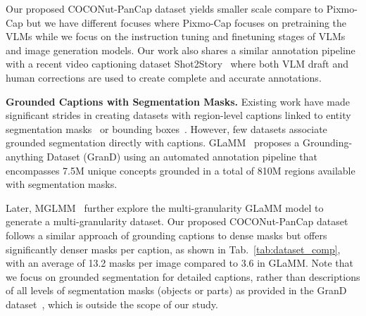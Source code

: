 Our proposed COCONut-PanCap dataset yields smaller scale compare to Pixmo-Cap but we have different focuses where Pixmo-Cap focuses on pretraining the VLMs while we focus on the instruction tuning and finetuning stages of VLMs and image generation models. Our work also shares a similar annotation pipeline with a recent video captioning dataset Shot2Story~\cite{han2023shot2story20k} where both VLM draft and human corrections are used to create complete and accurate annotations.



\noindent\textbf{Grounded Captions with Segmentation Masks.}
Existing work have made significant strides in creating datasets with region-level captions linked to entity segmentation masks~\cite{yuan2024osprey} or bounding boxes~\cite{zhang2023gpt4roi}. However, few datasets associate grounded segmentation directly with captions. GLaMM~\cite{hanoona2023GLaMM} proposes a Grounding-anything Dataset (GranD) using an automated annotation pipeline that encompasses 7.5M unique concepts grounded in a total of 810M regions available with segmentation masks. 
 
Later, MGLMM~\cite{zhou2024mglmm} further explore the multi-granularity GLaMM model to generate a multi-granularity dataset. Our proposed COCONut-PanCap dataset follows a similar approach of grounding captions to dense masks but offers significantly denser masks per caption, as shown in Tab.~\ref{tab:dataset_comp}, with an average of 13.2 masks per image compared to 3.6 in GLaMM. Note that we focus on grounded segmentation for detailed captions, rather than descriptions of all levels of segmentation masks (objects or parts) as provided in the GranD dataset~\cite{hanoona2023GLaMM}, which is outside the scope of our study.




